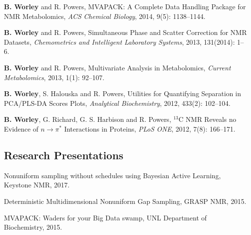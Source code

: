 \documentclass[letterpaper]{article}
\renewenvironment{itemize}{
  \begin{list}{}{
    \setlength{\leftmargin}{1.5em}
  }
}{
  \end{list}
}
\begin{document}
\begin{itemize}
\item \textbf{B. Worley} and R. Powers,
 MVAPACK: A Complete Data Handling Package for NMR Metabolomics,
 {\it ACS Chemical Biology},
 2014, 9(5): 1138--1144.
\end{itemize}

\begin{itemize}
\item \textbf{B. Worley} and R. Powers,
 Simultaneous Phase and Scatter Correction for NMR Datasets,
 {\it Chemometrics and Intelligent Laboratory Systems},
 2013, 131(2014): 1--6.
\end{itemize}

\begin{itemize}
\item \textbf{B. Worley} and R. Powers,
 Multivariate Analysis in Metabolomics,
 {\it Current Metabolomics},
 2013, 1(1): 92--107.
\end{itemize}

\begin{itemize}
\item \textbf{B. Worley}, S. Halouska and R. Powers,
 Utilities for Quantifying Separation in PCA/PLS-DA Scores Plots,
 {\it Analytical Biochemistry},
 2012, 433(2): 102--104.
\end{itemize}

\begin{itemize}
\item \textbf{B. Worley}, G. Richard, G. S. Harbison and R. Powers,
 $^{13}$C NMR Reveals no Evidence of $n\rightarrow\pi^*$ Interactions
 in Proteins, {\it PLoS ONE},
 2012, 7(8): 166--171.
\end{itemize}

\subsection*{Research Presentations}

\begin{itemize}
\item Nonuniform sampling without schedules using Bayesian Active Learning,
 Keystone NMR, 2017.
\end{itemize}

\begin{itemize}
\item Deterministic Multidimensional Nonuniform Gap Sampling,
  GRASP NMR, 2015.
\end{itemize}

\begin{itemize}
\item MVAPACK: Waders for your Big Data swamp,
  UNL Department of Biochemistry, 2015.
\end{itemize}
\end{document}
